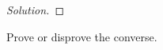 \documentclass{article}
\newenvironment{solution}{\begin{proof}[Solution]}{\end{proof}}
\renewcommand\qedsymbol{$\blacksquare$}
\newenvironment{innerproof}{\renewcommand{\qedsymbol}{$\square$}\proof}{\endproof}
\begin{document}
\begin{solution}
\begin{comment}
		This $\lambda$ is an eigenvalue of $T$.
		
		From here, we will introduce the following lemma:
		\begin{lem}
			Let $A$ denote some $n \times n$ matrix. Then, $A$ is invertible if and only if $A^{\intercal}$ is invertible.
		\end{lem}
		\begin{innerproof}
			We begin with the forward direction. Let us suppose that $A$ is invertible. Then, there exists some $B$ such that $AB = I$. Now, we observe the following:
			\begin{align*}
				AB = I &\iff (AB)^{\intercal} = I^{\intercal} \\
				&\iff B^{\intercal}A^{\intercal} = I.
			\end{align*}
		
			Then, indeed, we see that by the uniqueness of inverses, we have that $B^{\intercal}$ is the inverse of $A^{\intercal}$; $A^{\intercal}$ is invertible.
			
			For the backwards direction, we simply proceed backwards to see that, by uniqueness of inverses, we have that $B$ is the inverse of $A$, and thus $A$ is invertible.
		\end{innerproof}
	
		Now, with this in mind, we observe the following:
		\begin{align*}
			(A-\lambda I)^{\intercal} &= A^{\intercal} - (\lambda I)^{\intercal} \\
			&= A^{\intercal} - \lambda I^{\intercal} \\
			&= A^{\intercal} - \lambda I
		\end{align*}
	
		Now, we note that since $A - \lambda I \neq 0$, meaning that it is not invertible, we have then that $(A-\lambda I)^{\intercal} = A^{\intercal} - \lambda I$ is not invertible either; i.e. $A^{\intercal} - \lambda I \neq 0$.
		
		And we note that since $\mathcal{M}(T') = A^{\intercal}$, it follows then that $\lambda$ must then also be an eigenvalue of $T'$ as desired.
		\end{comment}
	\end{solution}
	\begin{hw}
		Prove or disprove the converse.
	\end{hw}
\end{document}
